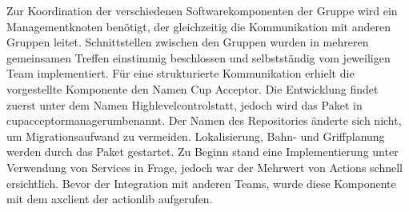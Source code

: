 Zur Koordination der verschiedenen Softwarekomponenten der Gruppe wird ein Managementknoten benötigt, der gleichzeitig die Kommunikation mit anderen Gruppen leitet. Schnittstellen zwischen den Gruppen wurden in mehreren gemeinsamen Treffen einstimmig beschlossen und selbstständig vom jeweiligen Team implementiert. Für eine strukturierte Kommunikation erhielt die vorgestellte Komponente den Namen \glqq Cup Acceptor\grqq . Die Entwicklung findet zuerst unter dem Namen \glqq Highlevelcontrol\grqq statt, jedoch wird das Paket in \glqq cup\textunderscore acceptor\textunderscore manager\grqq umbenannt. Der Namen des Repositories änderte sich nicht, um Migrationsaufwand zu vermeiden. Lokalisierung, Bahn- und Griffplanung werden durch das Paket gestartet. Zu Beginn stand eine Implementierung unter Verwendung von Services in Frage, jedoch war der Mehrwert von Actions schnell ersichtlich. Bevor der Integration mit anderen Teams, wurde diese Komponente mit dem axclient der actionlib aufgerufen.
